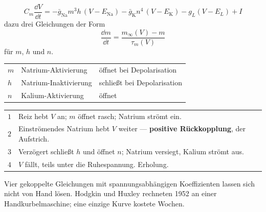 \begin{merksatz}
\[ C_m\frac{\dd V}{\dd t} = -\bar{g}_{\mathrm{Na}}m^3h\,(V-E_{\mathrm{Na}}) - \bar{g}_{\mathrm{K}}n^4\,(V-E_{\mathrm{K}}) - g_L(V-E_L) + I \]
dazu drei Gleichungen der Form
\[ \frac{\dd m}{\dd t} = \frac{m_\infty(V) - m}{\tau_m(V)} \]
für $m$, $h$ und $n$.

\begin{center}
{\small
\renewcommand{\arraystretch}{1.5}
\begin{tabular}{@{}P{1.4cm}P{2.6cm}P{4.0cm}@{}}
\toprule
$m$ & Natrium-Aktivierung & öffnet  bei Depolarisation\\
$h$ & Natrium-Inaktivierung & schließt  bei Depolarisation\\
$n$ & Kalium-Aktivierung & öffnet \\
\bottomrule
\end{tabular}}
\end{center}

\begin{center}
\renewcommand{\arraystretch}{1.5}
\begin{tabular}{@{}P{1.0cm}P{7.4cm}@{}}
\toprule
$1$ & Reiz hebt $V$ an; $m$ öffnet rasch; Natrium strömt ein.\\
$2$ & Einströmendes Natrium hebt $V$ weiter --- \textbf{positive Rückkopplung}, der Aufstrich.\\
$3$ & Verzögert schließt $h$ und öffnet $n$; Natrium versiegt, Kalium strömt aus.\\
$4$ & $V$ fällt, teils unter die Ruhespannung. Erholung.\\
\bottomrule
\end{tabular}
\end{center}

\begin{center}
\begin{minipage}{0.88\textwidth}
\end{minipage}
\end{center}

Vier gekoppelte Gleichungen mit spannungsabhängigen Koeffizienten lassen sich nicht von Hand lösen. Hodgkin und Huxley rechneten 1952 an einer Handkurbelmaschine; eine einzige Kurve kostete Wochen.

\begin{center}
\begin{minipage}{0.88\textwidth}
\end{minipage}
\end{center}
\end{merksatz}

